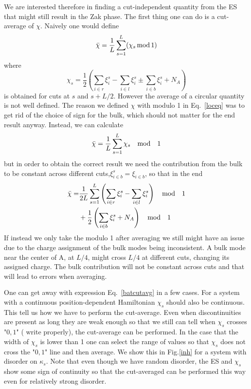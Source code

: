 \documentclass[twocolumn,amsmath,longbibliography,amssymb,superscriptaddress]{revtex4-1}
\newcommand{\carlos}[1]{{\color{red} #1}}
\begin{document}
We are interested therefore in finding a cut-independent quantity from the ES that might still result in the Zak phase. The first thing one can do is a cut-average of $\chi$. Naively one would define
\begin{equation}
\bar{\chi} = \frac{1}{L}\sum_{s=1}^L (\chi_s \, {\rm mod} \, 1 )
\label{batcutavg}
\end{equation}
where
\begin{equation}
\chi_s = \frac{1}{2} \left( \sum_{i\in r}\xi^s_i-\sum_{i\in l}\xi^s_i \pm \sum_{i\in b}\xi^s_i  + N_A \right) 
\end{equation}
is obtained for cuts at $s$ and $s+L/2$. However the average of a circular quantity is not well defined. The reason we defined $\chi$ with modulo 1 in Eq.~\eqref{loceq} was to get rid of the choice of sign for the bulk, which should not matter for the end result anyway. Instead, we can calculate
\begin{equation}
\bar{\chi} = \frac{1}{L}\sum_{s=1}^L \chi_s \quad {\rm mod} \quad 1 
\label{goodcutavg}
\end{equation}
but in order to obtain the correct result we need the contribution from the bulk to be constant across different cuts,$\xi_{i \in b}^s = \xi_{i \in b}$, so that in the end
\begin{align}
\bar{\chi} =& \frac{1}{2L}\sum_{s=1}^L \left( \sum_{i\in r}\xi^s_i-\sum_{i\in l}\xi^s_i \right) \quad {\rm mod} \quad 1 \\
&+\frac{1}{2} \left(\sum_{i\in b}\xi^s_i + N_A \right) \quad {\rm mod} \quad 1 \nonumber
\label{goodcutavg}
\end{align}
If instead we only take the modulo 1 after averaging we still might have an issue due to the charge assignment of the bulk modes being inconsistent. A bulk mode near the center of A, at $L/4$, might cross $L/4$ at different cuts, changing its assigned charge. The bulk contribution will not be constant across cuts and that will lead to errors when averaging. 

One can get away with expression Eq.~\eqref{batcutavg} in a few cases. For a system with a continuous position-dependent Hamiltonian $\chi_s$ should also be continuous. This tell us how we have to perform the cut-average. Even when discontinuities are present as long they are weak enough so that we still can tell when $\chi_s$ crosses "$0,1$" (\carlos{write properly}), the cut-average can be performed. In the case that the width of $\chi_s$ is lower than 1 one can select the range of values so that $\chi_s$ does not cross the "$0,1$" line and then average. We show this in Fig.\ref{inh} for a system with disorder on $\kappa_s$. Note that even though we have random disorder, the ES and $\chi_s$ show some sign of continuity so that the cut-averaged can be performed this way even for relatively strong disorder.
\end{document}
